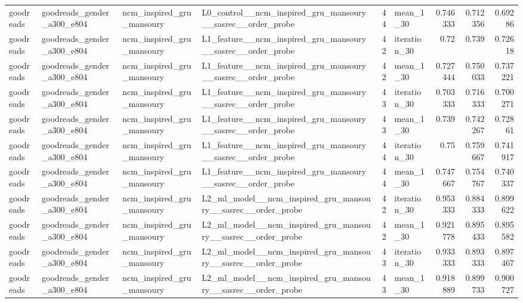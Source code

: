 \begin{table}[htbp!]
\begin{tabular}{llllrlrrr}
goodreads & goodreads\_gender\_a300\_e804 & ncm\_inspired\_gru\_mansoury & L0\_control\_\_ncm\_inspired\_gru\_mansoury\_\_sasrec\_\_order\_probe & 44 & mean\_1\_30 & 0.746333 & 0.712356 & 0.69286 \\
goodreads & goodreads\_gender\_a300\_e804 & ncm\_inspired\_gru\_mansoury & L1\_feature\_\_ncm\_inspired\_gru\_mansoury\_\_sasrec\_\_order\_probe & 42 & iteration\_30 & 0.72 & 0.739 & 0.72618 \\
goodreads & goodreads\_gender\_a300\_e804 & ncm\_inspired\_gru\_mansoury & L1\_feature\_\_ncm\_inspired\_gru\_mansoury\_\_sasrec\_\_order\_probe & 42 & mean\_1\_30 & 0.727444 & 0.750033 & 0.737221 \\
goodreads & goodreads\_gender\_a300\_e804 & ncm\_inspired\_gru\_mansoury & L1\_feature\_\_ncm\_inspired\_gru\_mansoury\_\_sasrec\_\_order\_probe & 43 & iteration\_30 & 0.703333 & 0.716333 & 0.700271 \\
goodreads & goodreads\_gender\_a300\_e804 & ncm\_inspired\_gru\_mansoury & L1\_feature\_\_ncm\_inspired\_gru\_mansoury\_\_sasrec\_\_order\_probe & 43 & mean\_1\_30 & 0.739 & 0.742267 & 0.72861 \\
goodreads & goodreads\_gender\_a300\_e804 & ncm\_inspired\_gru\_mansoury & L1\_feature\_\_ncm\_inspired\_gru\_mansoury\_\_sasrec\_\_order\_probe & 44 & iteration\_30 & 0.75 & 0.759667 & 0.741917 \\
goodreads & goodreads\_gender\_a300\_e804 & ncm\_inspired\_gru\_mansoury & L1\_feature\_\_ncm\_inspired\_gru\_mansoury\_\_sasrec\_\_order\_probe & 44 & mean\_1\_30 & 0.747667 & 0.754767 & 0.740337 \\
goodreads & goodreads\_gender\_a300\_e804 & ncm\_inspired\_gru\_mansoury & L2\_ml\_model\_\_ncm\_inspired\_gru\_mansoury\_\_sasrec\_\_order\_probe & 42 & iteration\_30 & 0.953333 & 0.884333 & 0.899622 \\
goodreads & goodreads\_gender\_a300\_e804 & ncm\_inspired\_gru\_mansoury & L2\_ml\_model\_\_ncm\_inspired\_gru\_mansoury\_\_sasrec\_\_order\_probe & 42 & mean\_1\_30 & 0.921778 & 0.895433 & 0.895582 \\
goodreads & goodreads\_gender\_a300\_e804 & ncm\_inspired\_gru\_mansoury & L2\_ml\_model\_\_ncm\_inspired\_gru\_mansoury\_\_sasrec\_\_order\_probe & 43 & iteration\_30 & 0.933333 & 0.893333 & 0.897467 \\
goodreads & goodreads\_gender\_a300\_e804 & ncm\_inspired\_gru\_mansoury & L2\_ml\_model\_\_ncm\_inspired\_gru\_mansoury\_\_sasrec\_\_order\_probe & 43 & mean\_1\_30 & 0.918889 & 0.899733 & 0.900727 \\

\end{tabular}
\end{table}
